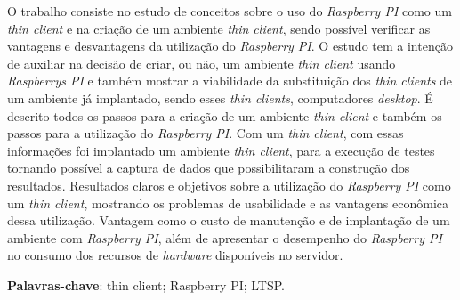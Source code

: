 \documentclass[
	12pt,				%
	openright,			%
	twoside,			%
	a4paper,			%
	chapter=TITLE,		%
	english,			%
	brazil				%
	]{abntex2}
\begin{document}






\setlength{\absparsep}{18pt} %
\begin{resumo}
O trabalho consiste no estudo de conceitos sobre o uso do \textit{Raspberry PI} como um \textit{thin client} e na criação de um ambiente \textit{thin client}, sendo possível verificar as vantagens e desvantagens da utilização do \textit{Raspberry PI}. O estudo tem a intenção de auxiliar na decisão de criar, ou não, um ambiente \textit{thin client} usando \textit{Raspberrys PI} e também mostrar a viabilidade da substituição  dos \textit{thin clients} de um ambiente já implantado, sendo esses \textit{thin clients}, computadores \textit{desktop}. É descrito todos os passos para a criação de um ambiente \textit{thin client} e também os passos para a utilização do \textit{Raspberry PI}. Com um \textit{thin client}, com essas informações foi implantado um ambiente \textit{thin client}, para a execução de testes tornando possível a captura de dados que possibilitaram a construção dos resultados. Resultados claros e objetivos sobre a utilização do \textit{Raspberry PI} como um \textit{thin client}, mostrando os problemas de usabilidade e as vantagens econômica dessa utilização. Vantagem como o custo de manutenção e de implantação de um ambiente com \textit{Raspberry PI}, além de apresentar o desempenho do \textit{Raspberry PI} no consumo dos recursos de \textit{hardware} disponíveis no servidor.


 \textbf{Palavras-chave}: thin client; Raspberry PI; LTSP.	%
\end{resumo}
\end{document}
